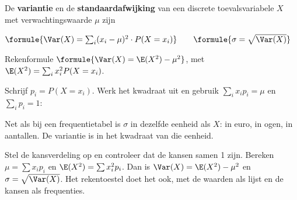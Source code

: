 \begin{theorie}
De \textbf{\textcolor{accent}{variantie}} en de \textbf{\textcolor{accent}{standaardafwijking}} van een discrete toevalsvariabele $X$ met verwachtingswaarde $\mu$ zijn

\vspace{1mm}
\qquad $\formule{\Var(X) = \sum_{i} (x_i - \mu)^2 \cdot P(X = x_i)} \qquad \formule{\sigma = \sqrt{\Var(X)}}$

\begin{stelling}{Rekenformule}
\qquad $\formule{\Var(X) = \E(X^2) - \mu^2}$, \quad met $\E(X^2) = \sum_i x_i^2 P(X = x_i)$.
\end{stelling}

\begin{bewijs}
Schrijf $p_i = P(X = x_i)$. Werk het kwadraat uit en gebruik $\sum_i x_i p_i = \mu$ en $\sum_i p_i = 1$:
\end{bewijs}
\end{theorie}

Net als bij een frequentietabel is $\sigma$ in dezelfde eenheid als $X$: in euro, in ogen, in aantallen. De variantie is in het kwadraat van die eenheid.


\begin{werkwijze}
Stel de kansverdeling op en controleer dat de kansen samen 1 zijn. Bereken $\mu = \sum x_i p_i$ en $\E(X^2) = \sum x_i^2 p_i$. Dan is $\Var(X) = \E(X^2) - \mu^2$ en $\sigma = \sqrt{\Var(X)}$. Het rekentoestel doet het ook, met de waarden als lijst en de kansen als frequenties.
\end{werkwijze}

